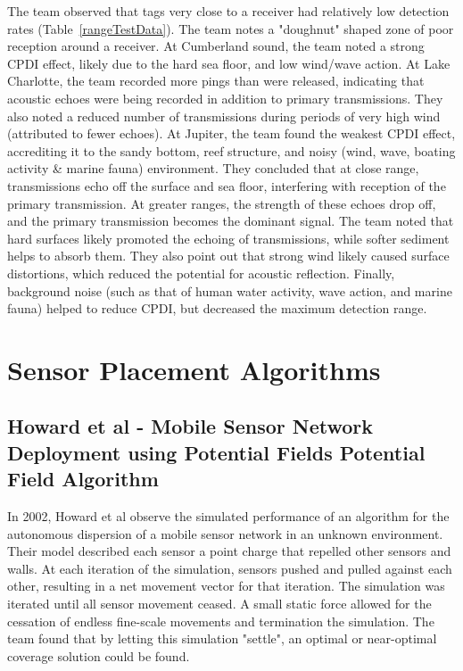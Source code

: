 The team observed that tags very close to a receiver had relatively low detection rates (Table~\ref{rangeTestData}).  The team notes a "doughnut" shaped zone of poor reception around a receiver.  At Cumberland sound, the team noted a strong CPDI effect, likely due to the hard sea floor, and low wind/wave action.  At Lake Charlotte, the team recorded more pings than were released, indicating that acoustic echoes were being recorded in addition to primary transmissions.   They also noted a reduced number of transmissions during periods of very high wind (attributed to fewer echoes).  At Jupiter, the team found the weakest CPDI effect, accrediting it to the sandy bottom, reef structure, and noisy (wind, wave, boating activity \& marine fauna) environment.  They concluded that at close range, transmissions echo off the surface and sea floor, interfering with reception of the primary transmission.  At greater ranges, the strength of these echoes drop off, and the primary transmission becomes the dominant signal.  The team noted that hard surfaces likely promoted the echoing of transmissions, while softer sediment helps to absorb them.  They also point out that strong wind likely caused surface distortions, which reduced the potential for acoustic reflection.  Finally, background noise (such as that of human water activity, wave action, and marine fauna) helped to reduce CPDI, but decreased the maximum detection range.


\section{Sensor Placement Algorithms}
\subsection{Howard et al - Mobile Sensor Network Deployment using Potential Fields Potential Field Algorithm}
In 2002, Howard et al observe the simulated performance of an algorithm for the autonomous dispersion of a mobile sensor network in an unknown environment.  Their model described each sensor a point charge that repelled other sensors and walls.  At each iteration of the simulation, sensors pushed and pulled against each other, resulting in a net movement vector for that iteration.  The simulation was iterated until all sensor movement ceased.  A small static force allowed for the cessation of endless fine-scale movements and termination the simulation.  The team found that by letting this simulation "settle", an optimal or near-optimal coverage solution could be found.  



